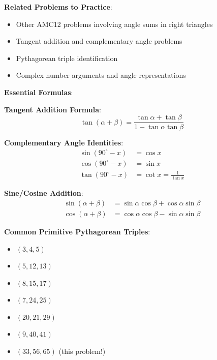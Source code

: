 \documentclass[12pt]{article}
\begin{document}
\vspace{0.5cm}

\textbf{Related Problems to Practice}:
\begin{itemize}
    \item Other AMC12 problems involving angle sums in right triangles
    \item Tangent addition and complementary angle problems
    \item Pythagorean triple identification
    \item Complex number arguments and angle representations
\end{itemize}

\vspace{0.5cm}

\textbf{Essential Formulas}:

\textbf{Tangent Addition Formula}:
$$\tan(\alpha + \beta) = \frac{\tan\alpha + \tan\beta}{1 - \tan\alpha \tan\beta}$$

\textbf{Complementary Angle Identities}:
\begin{align*}
    \sin(90^{\circ} - x) &= \cos x \\
    \cos(90^{\circ} - x) &= \sin x \\
    \tan(90^{\circ} - x) &= \cot x = \frac{1}{\tan x}
\end{align*}

\textbf{Sine/Cosine Addition}:
\begin{align*}
    \sin(\alpha + \beta) &= \sin\alpha \cos\beta + \cos\alpha \sin\beta \\
    \cos(\alpha + \beta) &= \cos\alpha \cos\beta - \sin\alpha \sin\beta
\end{align*}

\textbf{Common Primitive Pythagorean Triples}:
\begin{itemize}
    \item $(3, 4, 5)$
    \item $(5, 12, 13)$
    \item $(8, 15, 17)$
    \item $(7, 24, 25)$
    \item $(20, 21, 29)$
    \item $(9, 40, 41)$
    \item \textbf{$(33, 56, 65)$} (this problem!)
\end{itemize}
\end{document}
